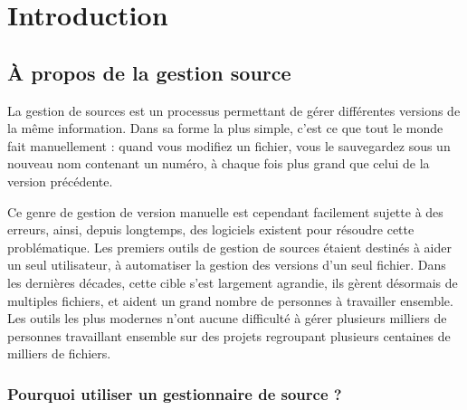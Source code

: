 \chapter{Introduction}
\label{chap:intro}

\section{À propos de la gestion source}

La gestion de sources est un processus permettant de gérer différentes
versions de la même information. Dans sa forme la plus simple, c'est
ce que tout le monde fait manuellement : quand vous modifiez
un fichier, vous le sauvegardez sous un nouveau nom contenant un numéro,
à chaque fois plus grand que celui de la version précédente.

Ce genre de gestion de version manuelle est cependant facilement sujette 
à des erreurs, ainsi, depuis longtemps, des logiciels existent pour
résoudre cette problématique. Les premiers outils de gestion de sources
étaient destinés à aider un seul utilisateur, à automatiser la gestion
des versions d'un seul fichier. Dans les dernières décades, cette cible 
s'est largement agrandie, ils gèrent désormais de multiples fichiers, et
aident un grand nombre de personnes à travailler ensemble. Les outils les
plus modernes n'ont aucune difficulté à gérer plusieurs milliers de 
personnes travaillant ensemble sur des projets regroupant plusieurs 
centaines de milliers de fichiers.

\subsection{Pourquoi utiliser un gestionnaire de source ?}

